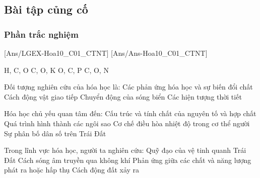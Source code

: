 \documentclass[Main.tex]{subfiles}
\begin{document}
\subsection{Bài tập củng cố}
\subsubsection{Phần trắc nghiệm}
[Ans/LGEX-Hoa10_C01_CTNT]
[Ans/Ans-Hoa10_C01_CTNT]
\hienthiloigiaiex
\begin{ex}
	\choice
	{\True H, C, O}
	{C, O, K}
	{O, C, P}
	{C, O, N}
\end{ex}

\begin{ex}
	Đối tượng nghiên cứu của hóa học là:
	\choice
	{\True Các phản ứng hóa học và sự biến đổi chất}
	{Cách động vật giao tiếp}
	{Chuyển động của sóng biển}
	{Các hiện tượng thời tiết}
\end{ex}

\begin{ex}
	Hóa học chủ yếu quan tâm đến:
	\choice
	{\True Cấu trúc và tính chất của nguyên tố và hợp chất}
	{Quá trình hình thành các ngôi sao}
	{Cơ chế điều hòa nhiệt độ trong cơ thể người}
	{Sự phân bố dân số trên Trái Đất}
\end{ex}

\begin{ex}
	Trong lĩnh vực hóa học, người ta nghiên cứu:
	\choice
	{Quỹ đạo của vệ tinh quanh Trái Đất}
	{Cách sóng âm truyền qua không khí}
	{\True Phản ứng giữa các chất và năng lượng phát ra hoặc hấp thụ}
	{Cách động đất xảy ra}
\end{ex}
\end{document}
